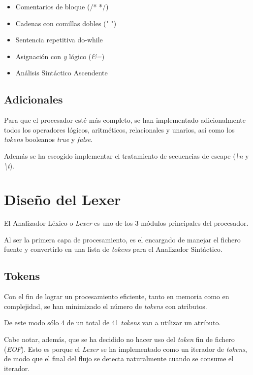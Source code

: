 \documentclass[a4paper]{CSMakotoTechnicalReport}
\begin{document}
\begin{multicols}{2}
    \begin{itemize}
        \item Comentarios de bloque (/* */)
        \item Cadenas con comillas dobles (" ")
        \item Sentencia repetitiva do-while
        \item Asignación con \textit{y} lógico (\textit{\&=})
        \item Análisis Sintáctico Ascendente
    \end{itemize}

    \subsection{Adicionales}

    Para que el procesador esté más completo, se han implementado adicionalmente todos los operadores lógicos, aritméticos, relacionales y unarios, así como los \textit{tokens} booleanos \textit{true} y \textit{false}.

    Además se ha escogido implementar el tratamiento de secuencias de escape (\textit{\textbackslash n} y \textit{\textbackslash t}).


    \section{Diseño del Lexer}
    
    El Analizador Léxico o \textit{Lexer} es uno de los 3 módulos principales del procesador.

    Al ser la primera capa de procesamiento, es el encargado de manejar el fichero fuente y convertirlo en una lista de \textit{tokens} para el Analizador Sintáctico.

    \subsection{Tokens}

    Con el fin de lograr un procesamiento eficiente, tanto en memoria como en complejidad, se han minimizado el número de \textit{tokens} con atributos.

    De este modo sólo 4 de un total de 41 \textit{tokens} van a utilizar un atributo.

    Cabe notar, además, que se ha decidido no hacer uso del \textit{token} fin de fichero (\textit{EOF}). Esto es porque el \textit{Lexer} se ha implementado como un iterador de \textit{tokens}, de modo que el final del flujo se detecta naturalmente cuando se consume el iterador.


\end{multicols}
\end{document}
